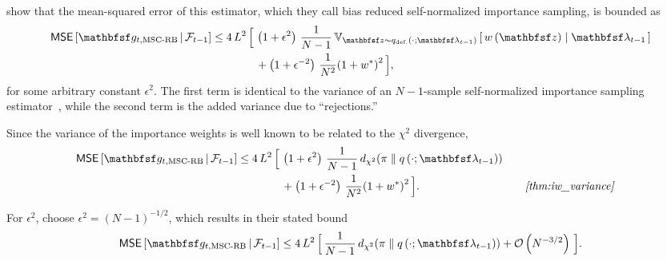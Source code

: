 \begin{proofEnd}
  \citet[Theorem 3]{cardoso_brsnis_2022} show that the mean-squared error of this estimator, which they call bias reduced self-normalized importance sampling, is bounded as
  \begin{align*}
    \mathsf{MSE}\left[ \rvvg_{t,\text{MSC-RB}} \,\middle|\, \mathcal{F}_{t-1} \right] \leq
    4\,L^2 \, \Big[\,&
     \left( 1 + \epsilon^2 \right)\, \frac{1}{N-1}\,\Vsub{\rvvz \sim q_{\text{def.}}\left(\cdot; \rvvlambda_{t-1}\right)}{w\left(\rvvz\right) \mid \rvvlambda_{t-1}} 
     \\
     &+
     \left(1 + \epsilon^{-2} \right)\, \frac{1}{N^2} {\left(1 + w^*\right)}^2 
    \,\Big],
  \end{align*}
  for some arbitrary constant \(\epsilon^2\).
  The first term is identical to the variance of an \(N-1\)-sample self-normalized importance sampling estimator~\citep{10.1214/17-STS611}, while the second term is the added variance due to ``rejections.''

  Since the variance of the importance weights is well known to be related to the \(\chi^2\) divergence,
  \begin{alignat}{2}
    \mathsf{MSE}\left[ \rvvg_{t,\text{MSC-RB}} \,\middle|\, \mathcal{F}_{t-1} \right] \leq
    4\,L^2 \, \Big[\,&
     \left( 1 + \epsilon^2 \right)\, \frac{1}{N-1}\,\DChi{\pi}{q\left(\cdot; \rvvlambda_{t-1}\right)}
    \nonumber
     \\
     &+
     \left(1 + \epsilon^{-2} \right)\, \frac{1}{N^2} {\left(1 + w^*\right)}^2 
    \,\Big].
    &&\quad\text{\textit{\cref{thm:iw_variance}}}
    \nonumber
  \end{alignat}

  For \(\epsilon^2\), \citeauthor{cardoso_brsnis_2022} choose \(\epsilon^2 = {\left(N-1\right)}^{-1/2}\), which results in their stated bound
  \begin{align*}
    \mathsf{MSE}\left[ \rvvg_{t,\text{MSC-RB}} \,\middle|\, \mathcal{F}_{t-1} \right] \leq
    4\,L^2 \, \Big[\,
      \frac{1}{N-1}\,\DChi{\pi}{q\left(\cdot; \rvvlambda_{t-1}\right)}
      +
      \mathcal{O}\left(N^{-3/2}\right)
    \,\Big].
  \end{align*}


\end{proofEnd}
